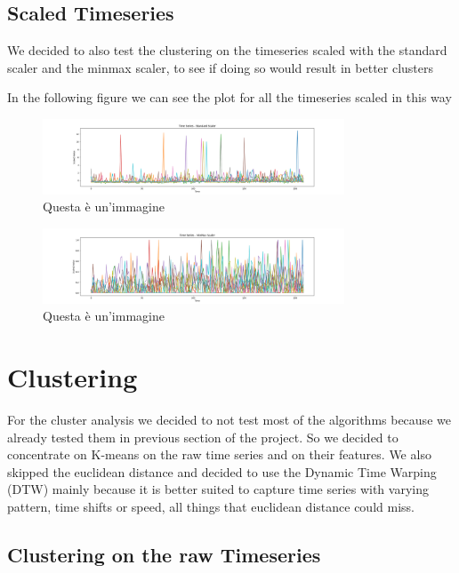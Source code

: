 \subsection{Scaled Timeseries}

We decided to also test the clustering on the timeseries scaled with the standard scaler and the minmax scaler, to see if doing so would result in better clusters

In the following figure we can see the plot for all the timeseries scaled in this way

\begin{figure}[ht]
    \centering
    \includegraphics[width= 0.8\textwidth]{images/Capitolo1/time_series_standard_scaler.png} 
    \caption{Questa è un'immagine} 
    \label{fig:time_series_standard_scaler}
\end{figure}

\begin{figure}[ht]
    \centering
    \includegraphics[width= 0.8\textwidth]{images/Capitolo1/time_series_minmax_scaler.png} 
    \caption{Questa è un'immagine} 
    \label{fig:time_series_minmax_scaler}
\end{figure}


\section{Clustering}

For the cluster analysis we decided to not test most of the algorithms because we already tested them in previous section of the project.
So we decided to concentrate on K-means on the raw time series and on their features.
We also skipped the euclidean distance and decided to use the Dynamic Time Warping (DTW) mainly because it is better suited to capture time series with varying pattern, time shifts or speed, all things that euclidean distance could miss.


\subsection{Clustering on the raw Timeseries}

